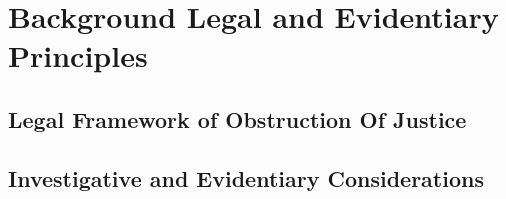 \section{Background Legal and Evidentiary Principles}

\subsection{Legal Framework of Obstruction Of Justice}

\subsection{Investigative and Evidentiary Considerations}
